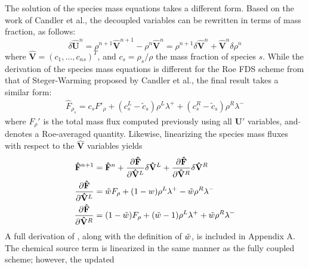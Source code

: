 The solution of the species mass equations takes a different form.  Based on the
work of Candler et al.\cite{candler}, the decoupled variables can be rewritten
in terms of mass fraction, as follows:
\begin{equation}
  \delta \mathbf{\hat{U}}^n =
  \rho^{n+1}\mathbf{\hat{V}}^{n+1}-\rho^n\mathbf{\hat{V}}^n = \rho^{n+1} \delta
  \mathbf{\hat{V}}^n + \mathbf{\hat{V}}^n \delta \rho^n 
\end{equation}
where $\mathbf{\hat{V}}=(c_1,\hdots,c_{ns})^T$, and $c_s=\rho_s/\rho$ the mass
fraction of species $s$.  While the derivation of the species mass equations is
different for the Roe FDS scheme from that of Steger-Warming proposed by Candler
et al.\cite{candler}, the final result takes a similar form: 
\begin{gather}
  \hat{F}_{\rho_s} = c_s F'_\rho+(c_s^L-\tilde{c}_s)\rho^L\lambda^+
  + (c_s^R-\tilde{c}_s)\rho^R\lambda^-
  \label{dc_flux}
\end{gather}
where $F_\rho'$ is the total mass flux computed previously using all
$\mathbf{U}'$ variables, and $\tilde{}$ denotes a Roe-averaged quantity.
Likewise, linearizing the species mass fluxes with respect to the
$\mathbf{\hat{V}}$ variables yields
\begin{align} 
  \mathbf{\hat{F}}^{n+1} &= \mathbf{\hat{F}}^n +\frac{\partial
  \mathbf{\hat{F}}}{\partial \mathbf{\hat{V}}^L}\delta \mathbf{\hat{V}}^L
  +\frac{\partial \mathbf{\hat{F}}}{\partial \mathbf{\hat{V}}^R}\delta
  \mathbf{\hat{V}}^R \\ \frac{\partial \mathbf{\hat{F}}}{\partial
  \mathbf{\hat{V}}^L} &= \tilde{w} F_\rho+(1-w)\rho^L\lambda^+ - \tilde{w} \rho^R\lambda^- \\
  \frac{\partial \mathbf{\hat{F}}}{\partial \mathbf{\hat{V}}^R} &=
  ( 1-\tilde{w} )F_\rho+(\tilde{w} -1)\rho^L\lambda^+ + \tilde{w} \rho^R\lambda^-
  \label{d_last}
\end{align}
A full derivation of , along with the
definition of $\tilde{w}$, is included in Appendix A.  The chemical source term is
linearized in the same manner as the fully coupled scheme; however, the updated
